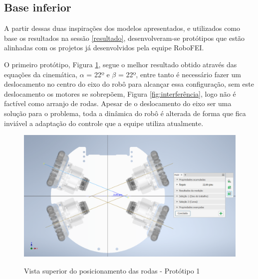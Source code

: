 \documentclass[deposito, acronym, symbols]{fei}
\begin{document}
\subsection{Base inferior}

A partir dessas duas inspirações dos modelos apresentados, e utilizados como base os resultados na sessão \ref{resultado}, desenvolveram-se protótipos que estão alinhadas com os projetos já desenvolvidos pela equipe RoboFEI.

O primeiro protótipo, Figura \ref{fig:proto 1}, segue o melhor resultado obtido através das equações da cinemática, $\alpha$ = 22º e $\beta$ = 22º, entre tanto é necessário fazer um deslocamento no centro do eixo do robô para alcançar essa configuração, sem este deslocamento os motores se sobrepõem, Figura \ref{fig:interferência}, logo não é factível como arranjo de rodas. Apesar de o deslocamento do eixo ser uma solução para o problema, toda a dinâmica do robô é alterada de forma que fica inviável a adaptação do controle que a equipe utiliza atualmente.

\begin{figure}[!htb]
    \centering
    \caption{Vista superior do posicionamento das rodas - Protótipo 1}
    \includegraphics[scale=0.4]{Imagens/Vista superior do posicionamento das rodas - Proto 1.png}
    \label{fig:proto 1}
\end{figure}
\end{document}
